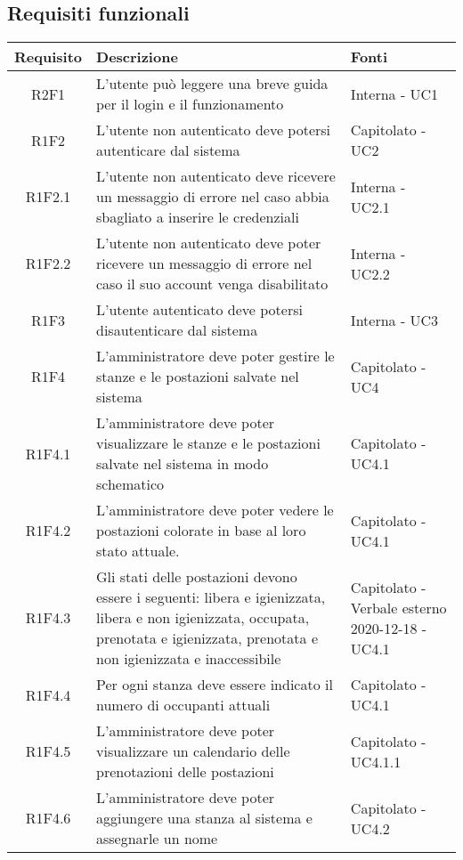 \subsection{Requisiti funzionali}
\begin{center}
	\begin{longtable}{|c|p{10cm}|p{4cm}|}
		\hline
		\rowcolor{lighter-grayer}
		\textbf{Requisito} & \textbf{Descrizione} & \textbf{Fonti}  \\
		\hline
		\endfirsthead
		
		 R2F1 & L'utente può leggere una breve guida per il login e il funzionamento & Interna - UC1 \\
		\hline
		R1F2	&	L'utente non autenticato deve potersi autenticare dal sistema& Capitolato - UC2	\\
		\hline
		R1F2.1	&	L'utente non autenticato deve ricevere un messaggio di errore nel caso abbia sbagliato a inserire le credenziali& Interna - UC2.1	\\
		\hline
		R1F2.2	&	L'utente non autenticato deve poter ricevere un messaggio di errore nel caso il suo account venga disabilitato& Interna - UC2.2	\\
		\hline
		R1F3	&	L'utente autenticato deve potersi disautenticare dal sistema& Interna - UC3	\\
		\hline
			R1F4&L'amministratore deve poter gestire le stanze e le postazioni salvate nel sistema	& Capitolato - UC4	\\
					\hline
			R1F4.1&L'amministratore deve poter visualizzare le stanze e le postazioni salvate nel sistema in modo schematico	& Capitolato - UC4.1	\\
					\hline
			R1F4.2&	L'amministratore deve poter vedere le postazioni colorate in base al loro stato attuale.& Capitolato - UC4.1	\\
					\hline
			R1F4.3&	Gli stati delle postazioni devono essere i seguenti: libera e igienizzata, libera e non igienizzata, occupata, prenotata e igienizzata, prenotata e non igienizzata e inaccessibile& 	Capitolato - Verbale esterno 2020-12-18 - UC4.1\\
					\hline
			R1F4.4&Per ogni stanza deve essere indicato il numero di occupanti attuali	& Capitolato - UC4.1	\\
					\hline
			R1F4.5&L'amministratore deve poter visualizzare un calendario delle prenotazioni delle postazioni	& Capitolato - UC4.1.1	\\
					\hline
				R1F4.6&L'amministratore deve poter aggiungere una stanza al sistema e assegnarle un nome	& Capitolato - UC4.2	\\

\end{longtable}
\end{center}
